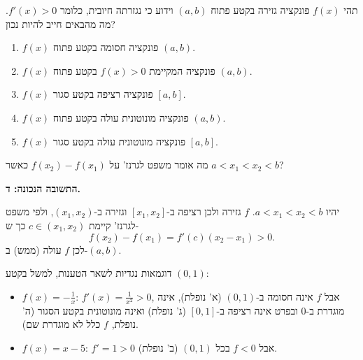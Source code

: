 
\begin{question}
תהי $f(x)$ פונקציה גזירה בקטע פתוח $(a,b)$ וידוע כי נגזרתה חיובית, כלומר $f'(x)>0$. מה מהבאים חייב להיות נכון?
\begin{enumerate}
  \item $f(x)$ פונקציה חסומה בקטע פתוח $(a,b)$.
  \item $f(x)$ פונקציה המקיימת $f(x)>0$ בקטע פתוח $(a,b)$.
  \item $f(x)$ פונקציה רציפה בקטע סגור $[a,b]$.
  \item $f(x)$ פונקציה מונוטונית עולה בקטע פתוח $(a,b)$.
  \item $f(x)$ פונקציה מונוטונית עולה בקטע סגור $[a,b]$.
\end{enumerate}
\end{question}

\begin{hint}
מה אומר משפט לגרנז' על $f(x_2)-f(x_1)$ כאשר $a<x_1<x_2<b$?
\end{hint}

\begin{solution}
\textbf{התשובה הנכונה: ד.}

יהיו $a<x_1<x_2<b$. $f$ גזירה ולכן רציפה ב-$[x_1,x_2]$ וגזירה ב-$(x_1,x_2)$, ולפי משפט לגרנז' קיימת $c\in(x_1,x_2)$ כך ש-
\[ f(x_2)-f(x_1)=f'(c)(x_2-x_1)>0 . \]
לכן $f$ עולה (ממש) ב-$(a,b)$.

דוגמאות נגדיות לשאר הטענות, למשל בקטע $(0,1)$:
\begin{itemize}
  \item $f(x)=-\frac1x$: $f'(x)=\frac1{x^2}>0$, אבל $f$ אינה חסומה ב-$(0,1)$ (א' נופלת), אינה מוגדרת ב-$0$ ובפרט אינה רציפה ב-$[0,1]$ (ג' נופלת) ואינה מונוטונית בקטע הסגור (ה' נופלת, $f$ כלל לא מוגדרת שם).
  \item $f(x)=x-5$: $f'=1>0$ אבל $f<0$ בכל $(0,1)$ (ב' נופלת).
\end{itemize}
\end{solution}
